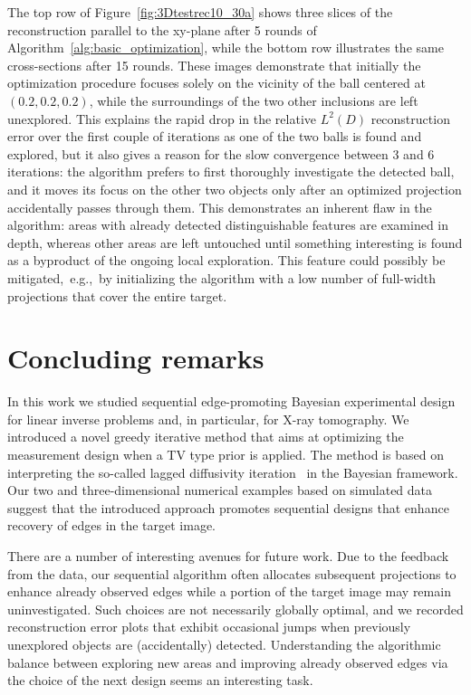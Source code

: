 \documentclass[final]{siamltex}
\begin{document}
The top row of Figure~\ref{fig:3Dtestrec10_30a} shows three slices of the reconstruction parallel to the xy-plane after 5 rounds of Algorithm~\ref{alg:basic_optimization}, while the bottom row illustrates the same cross-sections after 15 rounds. These images demonstrate that initially the optimization procedure focuses solely on the vicinity of the ball centered at $(0.2,0.2,0.2)$, while the surroundings of the two other inclusions are left unexplored. This explains the rapid drop in the relative $L^2(D)$ reconstruction error over the first couple of iterations as one of the two balls is found and explored, but it also gives a reason for the slow convergence between 3 and 6 iterations: the algorithm prefers to first thoroughly investigate the detected ball, and it moves its focus on the other two objects only after an optimized projection accidentally passes through them. This demonstrates an inherent flaw in the algorithm: areas with already detected distinguishable features are examined in depth, whereas other areas are left untouched until something interesting is found as a byproduct of the ongoing local exploration. This feature could possibly be mitigated,~e.g.,~by initializing the algorithm with a low number of full-width projections that cover the entire target.


\section{Concluding remarks}
\label{sec:conclusion}

In this work we studied sequential edge-promoting Bayesian experimental design for linear inverse problems and, in particular, for X-ray tomography. We introduced a novel greedy iterative method that aims at optimizing the measurement design when a TV type prior is applied. The method is based on interpreting the so-called lagged diffusivity iteration~\cite{Vogel96} in the Bayesian framework. Our two and three-dimensional numerical examples based on simulated data suggest that the introduced approach promotes sequential designs that enhance recovery of edges in the target image.

There are a number of interesting avenues for future work. Due to the feedback from the data, our sequential algorithm often allocates subsequent projections to enhance already observed edges while a portion of the target image may remain uninvestigated. Such choices are not necessarily globally optimal, and we recorded reconstruction error plots that exhibit occasional jumps when previously unexplored objects are (accidentally) detected. Understanding the algorithmic balance between exploring new areas and improving already observed edges via the choice of the next design seems an interesting task.
\end{document}
